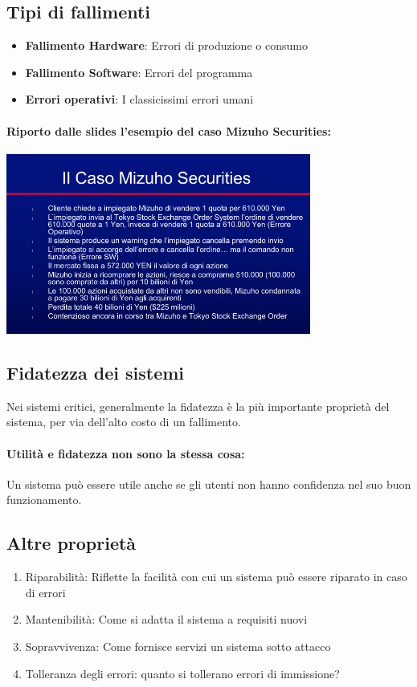 \documentclass[12pt, a4paper, openany, twoside]{book}
\begin{document}
\subsection{Tipi di fallimenti}
\begin{itemize}
	\item \textbf{Fallimento Hardware}: Errori di produzione o consumo
	\item \textbf{Fallimento Software}: Errori del programma
	\item \textbf{Errori operativi}: I classicissimi errori umani
\end{itemize}
\paragraph{Riporto dalle slides l'esempio del caso Mizuho Securities:}
\begin{center}
\includegraphics[width=0.75\textwidth]{1}
\end{center}
\subsection{Fidatezza dei sistemi}
Nei sistemi critici, generalmente la fidatezza è la più importante proprietà del
sistema, per via dell'alto costo di un fallimento.
\paragraph{Utilità e fidatezza non sono la stessa cosa:} Un sistema può essere utile
anche se gli utenti non hanno confidenza nel suo buon funzionamento.
\subsection{Altre proprietà}
\begin{enumerate}
	\item Riparabilità: Riflette la facilità con cui un sistema può essere 
	riparato in caso di errori
	\item Mantenibilità: Come si adatta il sistema a requisiti nuovi
	\item Sopravvivenza: Come fornisce servizi un sistema sotto attacco
	\item Tolleranza degli errori: quanto si tollerano errori di immissione?
\end{enumerate}
\end{document}
